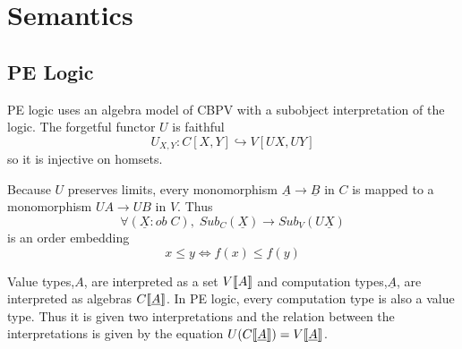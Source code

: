 \documentclass{article}
\begin{document}

\section{Semantics}

\subsection{PE Logic}

PE logic uses an algebra model of CBPV with a subobject interpretation of the logic.
The forgetful functor $U$ is faithful 
\[
   U_{X,Y} : C[ X , Y ]\hookrightarrow V[ UX , UY] 
\] 
so it is injective on homsets.

Because $U$ preserves limits, every monomorphism $\underline{A} \rightarrow \underline{B}$ in $C$
is mapped to a monomorphism $UA \rightarrow UB$ in $V$. Thus
\[
  \forall(\underline{X} : ob \; C), \; Sub_C(\underline{X}) \rightarrow Sub_V(U\underline{X})
\]
is an order embedding
\[
  x \leq y \iff f(x) \leq f(y)  
\]

Value types,$A$, are interpreted as a set $V\llbracket A \rrbracket$ 
and computation types,$\underline{A}$, are interpreted as algebras $C\llbracket \underline{A} \rrbracket$.
In PE logic, every computation type is also a value type.
Thus it is given two interpretations and the relation between the interpretations is given by the equation
 $U(C\llbracket \underline{A} \rrbracket) = V\llbracket \underline{A} \rrbracket$.
 
\end{document}
